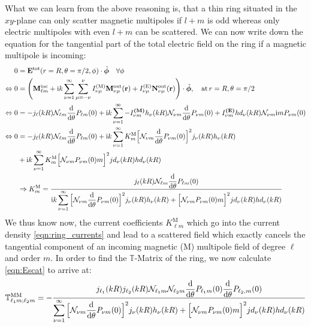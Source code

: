 What we can learn from the above reasoning is, that a thin ring situated in the $xy$-plane can only scatter magnetic multipoles if $l+m$ is odd whereas only electric multipoles with even $l+m$ can be scattered.
We can now write down the equation for the tangential part of the total electric field on the ring if a magnetic multipole is incoming:
\begin{align}
0&=\mathbf{E}^\mathrm{tot}(r=R,\theta=\pi/2,\phi)\cdot \hat{\bm{\phi}}\quad \forall \phi\\
\nonumber
\Leftrightarrow 0&=\left(\mathbf{M}^\mathrm{inc}_{\ell m} + \mathrm{i} k \sum_{\nu=1}^\infty  \sum_{\mu=-\nu}^\nu
I_{\nu \mu}^\mathrm{(M)}\mathbf{M}^\mathrm{out}_{\nu \mu}(\mathbf{r})+
I_{\nu \mu}^\mathrm{(E)}\mathbf{N}^\mathrm{out}_{\nu \mu}(\mathbf{r})\right) \cdot \hat{\bm{\phi}},\quad \mathrm{at}\, r=R, \theta=\pi/2
\\
\nonumber
\Leftrightarrow 0&=
-j_\ell(kR)\mathcal{N}_{\ell m}\frac{\mathrm{d}}{\mathrm{d}\theta}P_{\ell m}(0) 
+
\mathrm{i} k \sum_{\nu=1}^\infty  
-I_{\nu m}^\textbf{(M)}
h_\nu(kR)\mathcal{N}_{\nu m}\frac{\mathrm{d}}{\mathrm{d}\theta}P_{\nu m}(0) 
+
I_{\nu m}^\textbf{(E)}
hd_\nu(kR)\mathcal{N}_{\nu m}\mathrm{i} m  P_{\nu m}(0) \\ \nonumber
\Leftrightarrow
0 &= -j_\ell(kR)\mathcal{N}_{\ell m}\frac{\mathrm{d}}{\mathrm{d}\theta}P_{\ell m}(0) 
+ \mathrm{i} k\sum_{\nu = 1}^\infty
K^\mathrm{M}_{m}\Big[
\mathcal{N}_{\nu m} \frac{\mathrm{d}}{\mathrm{d} \theta}P_{\nu m}(0)
\Big]^2 j_\nu(kR) h_\nu(kR)
\\ \nonumber
&+ \mathrm{i} k\sum_{\nu = 1}^\infty
K^\mathrm{M}_{m} \Big[
\mathcal{N}_{\nu m} P_{\nu m}(0) m
\Big]^2jd_\nu(kR) hd_\nu(kR)
\\ \nonumber
&\Rightarrow K^\mathrm{M}_{m} = \frac{j_\ell(kR) \mathcal{N}_{\ell m}\dfrac{\mathrm{d}}{\mathrm{d} \theta}P_{\ell m}(0)}{\mathrm{i} k \displaystyle \sum_{\nu=1}^\infty
\Big[
\mathcal{N}_{\nu m} \frac{\mathrm{d}}{\mathrm{d} \theta}P_{\nu m}(0)
\Big]^2 j_\nu(kR) h_\nu(kR)
+
\Big[
\mathcal{N}_{\nu m} P_{\nu m}(0) m
\Big]^2jd_\nu(kR) hd_\nu(kR)
}
\end{align}
We thus know now, the current coefficients $K^\mathrm{M}_{\ell m}$ which go into the current density \cref{eqn:ring_currents} and lead to a scattered field which exactly cancels the tangential component of an incoming magnetic (M) multipole field of degree $\ell$ and order $m$. In order to
find the $\mathbb{T}$-Matrix of the ring, we now calculate \cref{eqn:Escat} to arrive at:
\begin{equation}
\mathbb{T}^\mathrm{MM}_{\ell_1 m;\ell_2 m} = -
\frac{j_{\ell_1}(kR)j_{\ell_2}(kR) \mathcal{N}_{\ell_1 m}\mathcal{N}_{\ell_2 m}
\dfrac{\mathrm{d}}{\mathrm{d} \theta}P_{\ell_1 m}(0)\dfrac{\mathrm{d}}{\mathrm{d} \theta}P_{\ell_2,m}(0)}{\displaystyle \sum_{\nu=1}^\infty
\Big[
\mathcal{N}_{\nu m} \frac{\mathrm{d}}{\mathrm{d} \theta}P_{\nu m}(0)
\Big]^2 j_\nu(kR) h_\nu(kR)
+
\Big[
\mathcal{N}_{\nu m} P_{\nu m}(0) m
\Big]^2jd_\nu(kR) hd_\nu(kR)
}
\end{equation}
